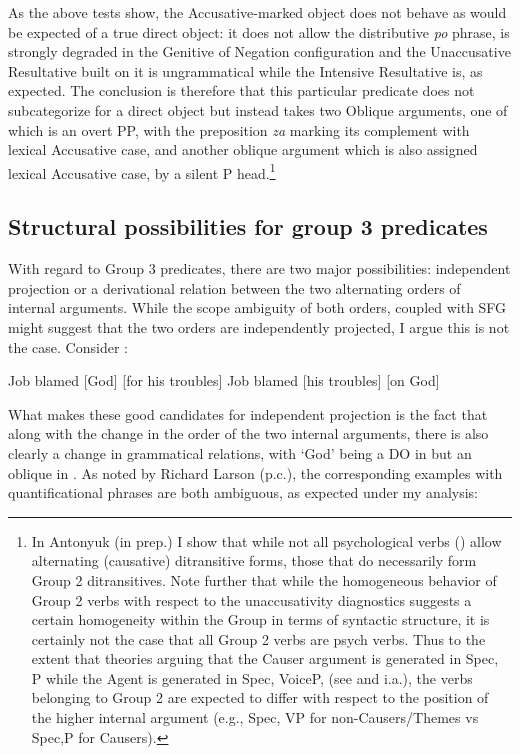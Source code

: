 \documentclass[output=paper,colorlinks,citecolor=brown,nonflat]{./langscibook}
\begin{document}
As the above tests show, the Accusative-marked object does not behave as would be expected of a true direct object: it does not allow the distributive \textit{po} phrase, is strongly degraded in the Genitive of Negation configuration and the Unaccusative Resultative built on it is ungrammatical while the Intensive Resultative is, as expected. The conclusion is therefore that this particular predicate does not subcategorize for a direct object but instead takes two Oblique arguments, one of which is an overt PP, with the preposition \textit{za} marking its complement with lexical Accusative case, and another oblique argument which is also assigned lexical Accusative case, by a silent P head.\footnote{In Antonyuk (in prep.) I show that while not all psychological verbs (\citealt{BellettiRizzi1988}) allow alternating (causative) ditransitive forms, those that do necessarily form Group 2 ditransitives. Note further that while the homogeneous behavior of Group 2 verbs with respect to the unaccusativity diagnostics suggests a certain homogeneity within the Group in terms of syntactic structure, it is certainly not the case that all Group 2 verbs are psych verbs. Thus to the extent that theories arguing that the Causer argument is generated in Spec, \liv P while the Agent is generated in Spec, VoiceP, (see \citealt{Kratzer2005} and \citealt{AlexiadouEtAl2006} i.a.), the verbs belonging to Group 2 are expected to differ with respect to the position of the higher internal argument (e.g., Spec, VP for non-Causers/Themes vs Spec,\liv P for Causers).}

\subsection{Structural possibilities for group 3 predicates}\label{sec:antonyuk:4.3}

With regard to Group 3 predicates, there are two major possibilities: independent projection or a derivational relation between the two alternating orders of internal arguments. While the scope ambiguity of both orders, coupled with SFG might suggest that the two orders are independently projected, I argue this is not the case. Consider :


\ea%
    \label{ex:antonyuk:56}
    \ea \label{ex:antonyuk:56a}
    Job blamed [God] [for his troubles] \hfill \citep{Larson1990}
    \ex \label{ex:antonyuk:56b}
    Job blamed [his troubles] [on God]
    \z
\z

What makes these good candidates for independent projection is the fact that along with the change in the order of the two internal arguments, there is also clearly a change in grammatical relations, with ‘God’ being a DO in  but an oblique in . As noted by Richard Larson (p.c.), the corresponding examples with quantificational phrases are both ambiguous, as expected under my analysis:
\end{document}
